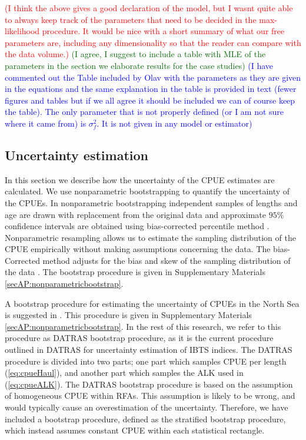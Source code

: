 \documentclass[a4paper 12pt]{article}
\numberwithin{equation}{section}
\newcommand{\ed}[1]{\textcolor{red}{#1}}
\newcommand{\nat}[1]{\textcolor{blue}{#1}}
\newcommand{\olav}[1]{\textcolor{darkgreen}{#1}}
\begin{document}
\ed{(I think the above gives a good declaration of the model, but I wasnt quite able to always keep track of the parameters that need to be decided in the max-likelihood procedure. It would be nice with a short summary of what our free parameters are, including any dimensionality so that the reader can compare with the data volume.)} \olav{(I agree, I suggest to include a table with MLE of the parameters in the section we elaborate results for the case studies)} \nat{(I have commented out the Table included by Olav with the parameters as they are given in the equations and the same explanation in the table is provided in text (fewer figures and tables but if we all agree it should be included we can of course keep the table).  The only parameter that is not properly defined (or I am not sure where it came from) is $\sigma_f^2$. It is not given in any model or estimator)}

\subsection{Uncertainty estimation}
\label{sec:uncertaintyestimation}
In this section we describe how the uncertainty of the CPUE estimates are calculated. We use nonparametric bootstrapping to quantify the uncertainty of the CPUEs. In nonparametric bootstrapping independent samples of lengths and age are drawn with replacement from the original data and approximate $95\%$ confidence intervals are obtained using bias-corrected percentile method  \citep{carpenter2000bootstrap}. Nonparametric resampling allows us to estimate the sampling distribution of the CPUE empirically without making assumptions concerning the data. The bias-Corrected method adjusts for the bias and skew of the sampling distribution of the data \citep{puth2015variety, karlsson2009bootstrap}. The bootstrap procedure is given in Supplementary Materials \ref{secAP:nonparametricbootstrap}.  

A bootstrap procedure for estimating the uncertainty of CPUEs in the North Sea is suggested in \citet{ICES2006Report}. This procedure is given in Supplementary Materials \ref{secAP:nonparametricbootstrap}. In the rest of this research, we refer to this procedure as DATRAS bootstrap procedure, as it is the current procedure outlined in DATRAS for uncertainty estimation of IBTS indices. The DATRAS procedure is divided into two parts; one part which samples CPUE per length (\ref{eq:cpueHaul}), and another part which samples the ALK used in (\ref{eq:cpueALK}). The DATRAS bootstrap procedure is based on the assumption of homogeneous CPUE within RFAs. This assumption is likely to be wrong, and would typically cause an overestimation of the uncertainty.  Therefore, we have included a bootstrap procedure, defined as the stratified bootstrap procedure, which instead assumes constant CPUE within each statistical rectangle. 
\end{document}
